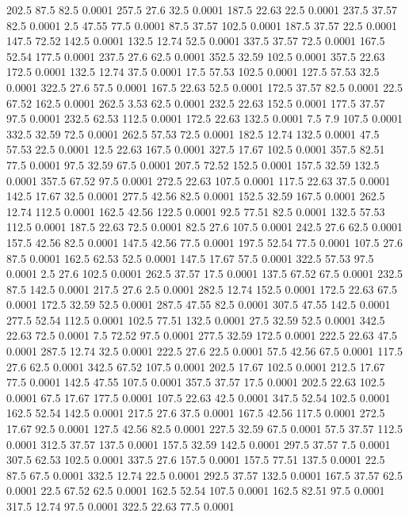 202.5	87.5	82.5	0.0001
257.5	27.6	32.5	0.0001
187.5	22.63	22.5	0.0001
237.5	37.57	82.5	0.0001
2.5	47.55	77.5	0.0001
87.5	37.57	102.5	0.0001
187.5	37.57	22.5	0.0001
147.5	72.52	142.5	0.0001
132.5	12.74	52.5	0.0001
337.5	37.57	72.5	0.0001
167.5	52.54	177.5	0.0001
237.5	27.6	62.5	0.0001
352.5	32.59	102.5	0.0001
357.5	22.63	172.5	0.0001
132.5	12.74	37.5	0.0001
17.5	57.53	102.5	0.0001
127.5	57.53	32.5	0.0001
322.5	27.6	57.5	0.0001
167.5	22.63	52.5	0.0001
172.5	37.57	82.5	0.0001
22.5	67.52	162.5	0.0001
262.5	3.53	62.5	0.0001
232.5	22.63	152.5	0.0001
177.5	37.57	97.5	0.0001
232.5	62.53	112.5	0.0001
172.5	22.63	132.5	0.0001
7.5	7.9	107.5	0.0001
332.5	32.59	72.5	0.0001
262.5	57.53	72.5	0.0001
182.5	12.74	132.5	0.0001
47.5	57.53	22.5	0.0001
12.5	22.63	167.5	0.0001
327.5	17.67	102.5	0.0001
357.5	82.51	77.5	0.0001
97.5	32.59	67.5	0.0001
207.5	72.52	152.5	0.0001
157.5	32.59	132.5	0.0001
357.5	67.52	97.5	0.0001
272.5	22.63	107.5	0.0001
117.5	22.63	37.5	0.0001
142.5	17.67	32.5	0.0001
277.5	42.56	82.5	0.0001
152.5	32.59	167.5	0.0001
262.5	12.74	112.5	0.0001
162.5	42.56	122.5	0.0001
92.5	77.51	82.5	0.0001
132.5	57.53	112.5	0.0001
187.5	22.63	72.5	0.0001
82.5	27.6	107.5	0.0001
242.5	27.6	62.5	0.0001
157.5	42.56	82.5	0.0001
147.5	42.56	77.5	0.0001
197.5	52.54	77.5	0.0001
107.5	27.6	87.5	0.0001
162.5	62.53	52.5	0.0001
147.5	17.67	57.5	0.0001
322.5	57.53	97.5	0.0001
2.5	27.6	102.5	0.0001
262.5	37.57	17.5	0.0001
137.5	67.52	67.5	0.0001
232.5	87.5	142.5	0.0001
217.5	27.6	2.5	0.0001
282.5	12.74	152.5	0.0001
172.5	22.63	67.5	0.0001
172.5	32.59	52.5	0.0001
287.5	47.55	82.5	0.0001
307.5	47.55	142.5	0.0001
277.5	52.54	112.5	0.0001
102.5	77.51	132.5	0.0001
27.5	32.59	52.5	0.0001
342.5	22.63	72.5	0.0001
7.5	72.52	97.5	0.0001
277.5	32.59	172.5	0.0001
222.5	22.63	47.5	0.0001
287.5	12.74	32.5	0.0001
222.5	27.6	22.5	0.0001
57.5	42.56	67.5	0.0001
117.5	27.6	62.5	0.0001
342.5	67.52	107.5	0.0001
202.5	17.67	102.5	0.0001
212.5	17.67	77.5	0.0001
142.5	47.55	107.5	0.0001
357.5	37.57	17.5	0.0001
202.5	22.63	102.5	0.0001
67.5	17.67	177.5	0.0001
107.5	22.63	42.5	0.0001
347.5	52.54	102.5	0.0001
162.5	52.54	142.5	0.0001
217.5	27.6	37.5	0.0001
167.5	42.56	117.5	0.0001
272.5	17.67	92.5	0.0001
127.5	42.56	82.5	0.0001
227.5	32.59	67.5	0.0001
57.5	37.57	112.5	0.0001
312.5	37.57	137.5	0.0001
157.5	32.59	142.5	0.0001
297.5	37.57	7.5	0.0001
307.5	62.53	102.5	0.0001
337.5	27.6	157.5	0.0001
157.5	77.51	137.5	0.0001
22.5	87.5	67.5	0.0001
332.5	12.74	22.5	0.0001
292.5	37.57	132.5	0.0001
167.5	37.57	62.5	0.0001
22.5	67.52	62.5	0.0001
162.5	52.54	107.5	0.0001
162.5	82.51	97.5	0.0001
317.5	12.74	97.5	0.0001
322.5	22.63	77.5	0.0001
